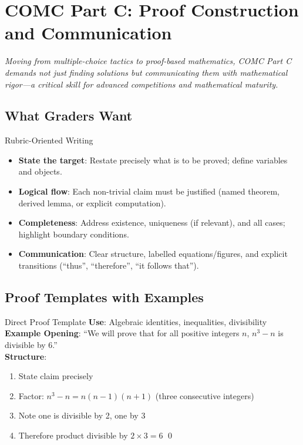 \documentclass{article}
\begin{document}
\newpage

\section{COMC Part C: Proof Construction and Communication}

\textit{Moving from multiple-choice tactics to proof-based mathematics, COMC Part C demands not just finding solutions but communicating them with mathematical rigor---a critical skill for advanced competitions and mathematical maturity.}

\subsection{What Graders Want}
\begin{contextbox}{Rubric-Oriented Writing}
\begin{itemize}
    \item \textbf{State the target}: Restate precisely what is to be proved; define variables and objects.
    \item \textbf{Logical flow}: Each non-trivial claim must be justified (named theorem, derived lemma, or explicit computation).
    \item \textbf{Completeness}: Address existence, uniqueness (if relevant), and all cases; highlight boundary conditions.
    \item \textbf{Communication}: Clear structure, labelled equations/figures, and explicit transitions (``thus'', ``therefore'', ``it follows that'').
\end{itemize}
\end{contextbox}

\subsection{Proof Templates with Examples}
\begin{formalbox}{Direct Proof Template}
\textbf{Use}: Algebraic identities, inequalities, divisibility\\
\textbf{Example Opening}: ``We will prove that for all positive integers $n$, $n^3 - n$ is divisible by 6.''\\
\textbf{Structure}:
\begin{enumerate}[nosep]
\item State claim precisely
\item Factor: $n^3 - n = n(n-1)(n+1)$ (three consecutive integers)
\item Note one is divisible by 2, one by 3
\item Therefore product divisible by $2 \times 3 = 6$ \qed
\end{enumerate}
\end{formalbox}
\end{document}
